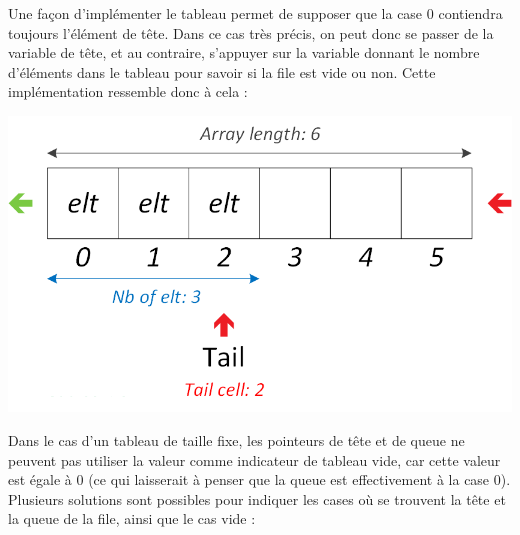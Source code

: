 \documentclass[11pt,a4paper]{article}
\begin{document}
\smallskip

Une façon d'implémenter le tableau permet de supposer que la case $ 0 $ contiendra toujours l'élément de tête.
Dans ce cas très précis, on peut donc se passer de la variable de tête, et au contraire, s'appuyer sur la variable donnant le nombre d'éléments dans le tableau pour savoir si la file est vide ou non.
Cette implémentation ressemble donc à cela :\\

\begin{center}
\includegraphics[scale=1]{img/files/Files_5_Tableau_Statique_Structure_Detaillee_2.png}
\end{center}

\smallskip

Dans le cas d'un tableau de taille fixe, les pointeurs de tête et de queue ne peuvent pas utiliser la valeur  comme indicateur de tableau vide, car cette valeur est égale à $ 0 $ (ce qui laisserait à penser que la queue est effectivement à la case 0).
Plusieurs solutions sont possibles pour indiquer les cases où se trouvent la tête et la queue de la file, ainsi que le cas vide :
\end{document}
